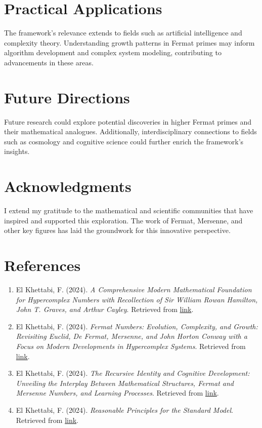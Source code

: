 \documentclass[12pt]{article}
\begin{document}
\section{Practical Applications}
The framework's relevance extends to fields such as artificial intelligence and complexity theory. Understanding growth patterns in Fermat primes may inform algorithm development and complex system modeling, contributing to advancements in these areas.

\section{Future Directions}
Future research could explore potential discoveries in higher Fermat primes and their mathematical analogues. Additionally, interdisciplinary connections to fields such as cosmology and cognitive science could further enrich the framework's insights.

\section{Acknowledgments}
I extend my gratitude to the mathematical and scientific communities that have inspired and supported this exploration. The work of Fermat, Mersenne, and other key figures has laid the groundwork for this innovative perspective.

\section{References}
\begin{enumerate}
    \item El Khettabi, F. (2024). \textit{A Comprehensive Modern Mathematical Foundation for Hypercomplex Numbers with Recollection of Sir William Rowan Hamilton, John T. Graves, and Arthur Cayley}. Retrieved from \href{https://efaysal.github.io/HCNFEK2024FE/HypComNumSetTheGCFEKFEB2024.pdf}{link}.
    \item El Khettabi, F. (2024). \textit{Fermat Numbers: Evolution, Complexity, and Growth: Revisiting Euclid, De Fermat, Mersenne, and John Horton Conway with a Focus on Modern Developments in Hypercomplex Systems}. Retrieved from \href{https://efaysal.github.io/HCNFEK2024FE/BokanConwayHypComNumSetTheGCFEK2024.pdf}{link}.
    \item El Khettabi, F. (2024). \textit{The Recursive Identity and Cognitive Development: Unveiling the Interplay Between Mathematical Structures, Fermat and Mersenne Numbers, and Learning Processes}. Retrieved from \href{https://efaysal.github.io/HCNFEK2024FE/CONREASFEKAUGUST2024E.pdf}{link}.
    \item El Khettabi, F. (2024). \textit{Reasonable Principles for the Standard Model}. Retrieved from \href{https://efaysal.github.io/HCNFEK2024FE/REASPRINCFEKAUGUST2000.pdf}{link}.
\end{enumerate}
\end{document}
